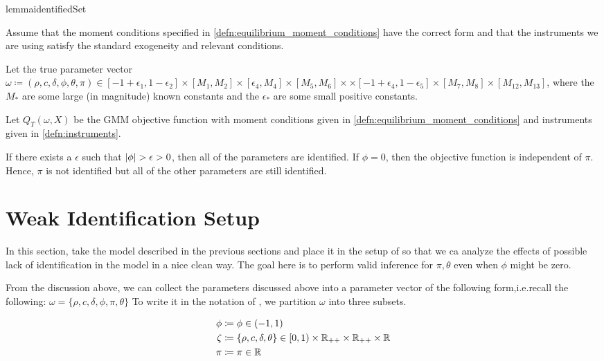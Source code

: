 \documentclass[11pt, letterpaper, twoside, final]{article}
\begin{document}
\begin{restatable}{lemma}{identifiedSet}

    Assume that the moment conditions specified in \cref{defn:equilibrium_moment_conditions} have the correct form
    and that the instruments we are using satisfy the standard exogeneity and relevant conditions. 

    Let the true parameter vector $\omega \coloneqq (\rho, c, \delta, \phi, \theta, \pi) \in [-1+\epsilon_1,
    1 - \epsilon_2] \times [M_1, M_2] \times [\epsilon_4, M_4]\times [M_5, M_6]\times \times [-1 +
    \epsilon_4, 1 - \epsilon_5] \times [M_7, M_8] \times [M_12, M_13]$, where the $M_{\ast}$ are some large (in
    magnitude) known constants and the $\epsilon_{\ast}$ are some small positive constants.  

    Let $Q_T(\omega, X)$  be the GMM objective function with moment conditions given in
    \cref{defn:equilibrium_moment_conditions} and instruments given in  \cref{defn:instruments}.

    If there exists a $\epsilon$ such that $\lvert\phi\rvert > \epsilon > 0$, then all of the parameters are identified. 
    If $\phi = 0$, then the objective function is independent of $\pi$. 
    Hence, $\pi$ is not identified but all of the other parameters are still identified.

\end{restatable}



\section{Weak Identification Setup}

In this section, take the model described in the previous sections and place it in the setup of
\textcite{andrews2014Gmm} so that we ca analyze the effects of possible lack of identification in the model in a
nice clean way.
The goal here is to perform valid inference for $\pi, \theta$ even when $\phi$ might be zero. 


From the discussion above, we can collect the parameters discussed above into a parameter vector of the following
form,i.e.\@ recall the following: $\omega = \lbrace \rho, c, \delta, \phi, \pi, \theta \rbrace$
To write it in the notation of \textcite{andrews2014Gmm}, we partition $\omega$ into three subsets.

\begin{align}
    \phi &\coloneqq \phi  \in (-1, 1) \\ 
    \zeta &\coloneqq \lbrace \rho, c, \delta, \theta \rbrace \in [0,1) \times \mathbb{R}_{++} \times \mathbb{R}_{++} \times
    \mathbb{R}  \\
    \pi &\coloneqq \pi \in \mathbb{R}
\end{align}
\end{document}
